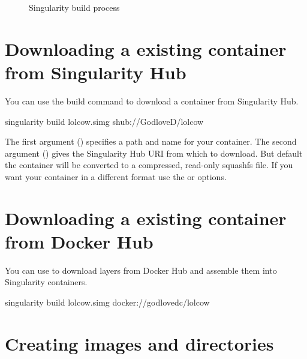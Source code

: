 \documentclass[letterpaper,10pt,english]{sphinxmanual}
\begin{document}
\begin{figure}[htbp]
\centering
\capstart

\noindent{}
\caption{Singularity build process}\label{\detokenize{build_a_container:id1}}\end{figure}


\section{Downloading a existing container from Singularity Hub}
\label{\detokenize{build_a_container:downloading-a-existing-container-from-singularity-hub}}
You can use the build command to download a container from Singularity
Hub.

%
\begin{sphinxVerbatim}[commandchars=\\\{\}]
\PYGZdl{} singularity build lolcow.simg shub://GodloveD/lolcow
\end{sphinxVerbatim}

The first argument () specifies a path and name for your container.
The second argument () gives the Singularity Hub URI from which to download.
But default the container will be converted to a compressed, read-only
squashfs file. If you want your container in a different format use
the  or  options.


\section{Downloading a existing container from Docker Hub}
\label{\detokenize{build_a_container:downloading-a-existing-container-from-docker-hub}}
You can use  to download layers from Docker Hub and assemble them into
Singularity containers.

%
\begin{sphinxVerbatim}[commandchars=\\\{\}]
\PYGZdl{} singularity build lolcow.simg docker://godlovedc/lolcow
\end{sphinxVerbatim}


\section{Creating  images and  directories}
\label{\detokenize{build_a_container:creating-writable-images-and-sandbox-directories}}
\end{document}
